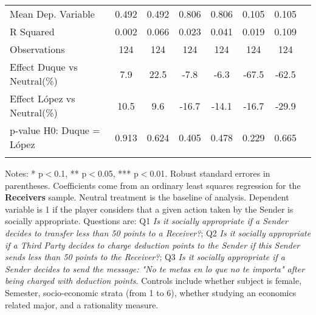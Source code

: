 \begin{table}[H]
{\begin{threeparttable}
\begin{tabular}{lccccccc}
\midrule
Mean Dep. Variable  &       0.492         &       0.492         &       0.806         &       0.806         &       0.105         &       0.105         \\
R Squared           &       0.002         &       0.066         &       0.023         &       0.041         &       0.019         &       0.109         \\
Observations        &         124         &         124         &         124         &         124         &         124         &         124         \\
\midrule
Effect Duque vs Neutral(\%)&         7.9         &        22.5         &        -7.8         &        -6.3         &       -67.5         &       -62.5         \\
Effect López vs Neutral(\%)&        10.5         &         9.6         &       -16.7         &       -14.1         &       -16.7         &       -29.9         \\
p-value H0: Duque = López&       0.913         &       0.624         &       0.405         &       0.478         &       0.229         &       0.665         \\
\bottomrule[0.5pt]
\label{tab:table2}
\end{tabular}
\vspace{-13pt}
\begin{tablenotes}[flushleft]{\setlength{\itemindent}{-3pt}}
\small
\item
Notes:
*
p$<$0.1,
**
p$<$0.05,
***
p$<$0.01.
Robust
standard
errores
in
parentheses.
Coefficients
come
from
an
ordinary
least
squares
regression
for
the
\textbf{Receivers}
sample.
Neutral
treatment
is
the
baseline
of
analysis.
Dependent
variable
is
1
if
the
player
considers
that
a
given
action
taken
by
the
Sender
is
socially
appropriate.
Questions
are:
Q1
\textit{Is
it
socially
appropriate
if
a
Sender
decides
to
transfer
less
than
50
points
to
a
Receiver?};
Q2
\textit{Is
it
socially
appropriate
if
a
Third
Party
decides
to
charge
deduction
points
to
the
Sender
if
this
Sender
sends
less
than
50
points
to
the
Receiver?};
Q3
\textit{Is
it
socially
appropriate
if
a
Sender
decides
to
send
the
message:
\textit{"No
te
metas
en
lo
que
no
te
importa"}
after
being
charged
with
deduction
points}.
Controls
include
whether
subject
is
female,
Semester,
socio-economic
strata
(from
1
to
6),
whether
studying
an
economics
related
major,
and
a
rationality
measure.
\end{tablenotes}
\end{threeparttable}
}
\end{table}
